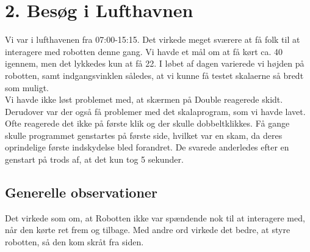 \section{2. Besøg i Lufthavnen}
Vi var i lufthavenen fra 07:00-15:15. Det virkede meget sværere at få folk til at interagere med robotten denne gang. Vi havde et mål om at få kørt ca. 40 igennem, men det lykkedes kun at få 22. I løbet af dagen varierede vi højden på robotten, samt indgangsvinklen således, at vi kunne få testet skalaerne så bredt som muligt.\\
Vi havde ikke løst problemet med, at skærmen på Double reagerede skidt. Derudover var der også få problemer med det skalaprogram, som vi havde lavet. Ofte reagerede det ikke på første klik og der skulle dobbeltklikkes. Få gange skulle programmet genstartes på første side, hvilket var en skam, da deres oprindelige første indskydelse bled forandret. De svarede anderledes efter en genstart på trods af, at det kun tog 5 sekunder.

\subsection{Generelle observationer}
Det virkede som om, at Robotten ikke var spændende nok til at interagere med, når den kørte ret frem og tilbage. Med andre ord virkede det bedre, at styre robotten, så den kom skråt fra siden. 